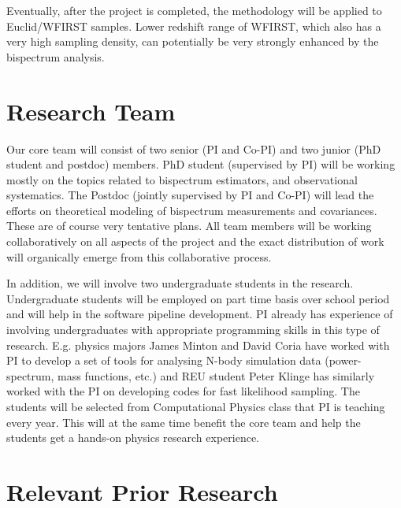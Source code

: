 Eventually, after the project is completed, the methodology will be applied to
Euclid/WFIRST samples. Lower redshift range of WFIRST, which also has a very
high sampling density, can potentially be very strongly enhanced by the
bispectrum analysis.

\section{Research Team}

Our core team will consist of two senior (PI and Co-PI) and two junior (PhD
student and postdoc) members. PhD student (supervised by PI) will be working
mostly on the topics related to bispectrum estimators, and observational
systematics. The Postdoc (jointly supervised by PI and Co-PI) will lead the
efforts on theoretical modeling of bispectrum measurements and covariances.
These are of course very tentative plans. All team members will be working
collaboratively on all aspects of the project and the exact distribution of
work will organically emerge from this collaborative process. 

In addition, we will involve two undergraduate students in the research.
Undergraduate students will be employed on part time basis over school period
and will help in the software pipeline development. PI already has experience
of involving undergraduates with appropriate programming skills in this type of
research. E.g. physics majors James Minton and David Coria have worked with PI
to develop a set of tools for analysing N-body simulation data (power-spectrum,
mass functions, etc.) and REU student Peter Klinge has similarly worked with
the PI on developing codes for fast likelihood sampling. The students will be
selected from Computational Physics class that PI is teaching every year. This
will at the same time benefit the core team and help the students get a
hands-on physics research experience.







\section{Relevant Prior Research}

